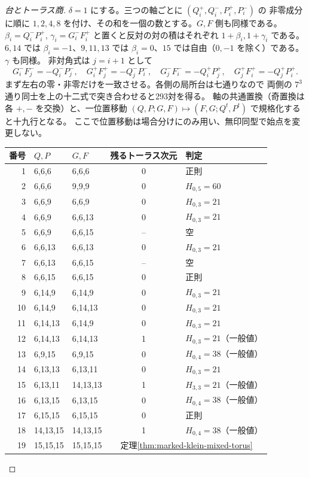 \begin{proof}[台とトーラス商]
$\delta=1$ にする。三つの軸ごとに $(Q_i^+,Q_i^-,P_i^+,P_i^-)$ の
非零成分に順に $1,2,4,8$ を付け、その和を一個の数とする。$G,F$ 側も同様である。
$\beta_i=Q_i^-P_i^+$, $\gamma_i=G_i^-F_i^+$ と置くと反対の対の積はそれぞれ $1+\beta_i,1+\gamma_i$ である。
$6,14$ では $\beta_i=-1$、$9,11,13$ では $\beta_i=0$、$15$ では自由（$0,-1$ を除く）である。$\gamma$ も同様。
非対角式は $j=i+1$ として
\[
 G_i^-F_j^-=-Q_i^-P_j^-,\quad G_i^+F_j^+=-Q_j^-P_i^-,
 \quad G_j^-F_i^-=-Q_i^+P_j^+,\quad G_j^+F_i^+=-Q_j^+P_i^+ .
\]
まず左右の零・非零だけを一致させる。各側の局所台は七通りなので
両側の $7^3$ 通り同士を上の十二式で突き合わせると293対を得る。
軸の共通置換（奇置換は各 $+,-$ を交換）と、一位置移動
$(Q,P;G,F)\mapsto(F,G;Q^t,P^t)$ で規格化すると十九行となる。
ここで位置移動は場合分けにのみ用い、無印同型で始点を変更しない。

\begin{center}\small
\begin{tabular}{r|l|l|c|l}
番号&$Q,P$&$G,F$&残るトーラス次元&判定\\\hline
1&6,6,6&6,6,6&0&正則\\
2&6,6,6&9,9,9&0&$H_{0,5}=60$\\
3&6,6,9&6,6,9&0&$H_{0,3}=21$\\
4&6,6,9&6,6,13&0&$H_{0,3}=21$\\
5&6,6,9&6,6,15&--&空\\
6&6,6,13&6,6,13&0&$H_{0,3}=21$\\
7&6,6,13&6,6,15&--&空\\
8&6,6,15&6,6,15&0&正則\\
9&6,14,9&6,14,9&0&$H_{0,3}=21$\\
10&6,14,9&6,14,13&0&$H_{0,3}=21$\\
11&6,14,13&6,14,9&0&$H_{0,3}=21$\\
12&6,14,13&6,14,13&1&$H_{0,3}=21$（一般値）\\
13&6,9,15&6,9,15&0&$H_{0,4}=38$（一般値）\\
14&6,13,13&6,13,11&0&$H_{0,3}=21$\\
15&6,13,11&14,13,13&1&$H_{3,3}=21$（一般値）\\
16&6,13,15&6,13,15&0&$H_{0,4}=38$（一般値）\\
17&6,15,15&6,15,15&0&正則\\
18&14,13,15&14,13,15&1&$H_{0,4}=38$（一般値）\\
19&15,15,15&15,15,15&\multicolumn{2}{c}{定理\ref{thm:marked-klein-mixed-torus}}
\end{tabular}
\end{center}


\end{proof}
